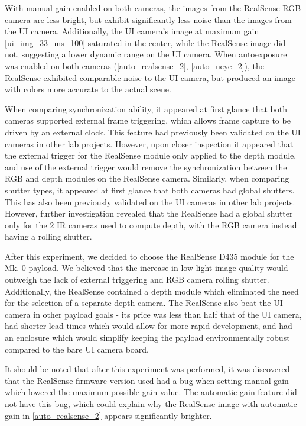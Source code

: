 \begin{description}
	With manual gain enabled on both cameras, the images from the RealSense RGB camera are less bright, but exhibit significantly less noise than the images from the UI camera. Additionally, the UI camera's image at maximum gain \ref{ui_img_33_ms_100} saturated in the center, while the RealSense image did not, suggesting a lower dynamic range on the UI camera. When autoexposure was enabled on both cameras (\ref{auto_realsense_2}, \ref{auto_ueye_2}), the RealSense exhibited comparable noise to the UI camera, but produced an image with colors more accurate to the actual scene.
	
	When comparing synchronization ability, it appeared at first glance that both cameras supported external frame triggering, which allows frame capture to be driven by an external clock. This feature had previously been validated on the UI cameras in other lab projects. However, upon closer inspection it appeared that the external trigger for the RealSense module only applied to the depth module, and use of the external trigger would remove the synchronization between the RGB and depth modules on the RealSense camera. Similarly, when comparing shutter types, it appeared at first glance that both cameras had global shutters. This has also been previously validated on the UI cameras in other lab projects. However, further investigation revealed that the RealSense had a global shutter only for the 2 IR cameras used to compute depth, with the RGB camera instead having a rolling shutter.
	
	After this experiment, we decided to choose the RealSense D435 module for the Mk. 0 payload. We believed that the increase in low light image quality would outweigh the lack of external triggering and RGB camera rolling shutter. Additionally, the RealSense contained a depth module which eliminated the need for the selection of a separate depth camera. The RealSense also beat the UI camera in other payload goals - its price was less than half that of the UI camera, had shorter lead times which would allow for more rapid development, and had an enclosure which would simplify keeping the payload environmentally robust compared to the bare UI camera board.
	
	It should be noted that after this experiment was performed, it was discovered that the RealSense firmware version used had a bug when setting manual gain which lowered the maximum possible gain value. The automatic gain feature did not have this bug, which could explain why the RealSense image with automatic gain in \ref{auto_realsense_2} appears significantly brighter.
	

\end{description}
